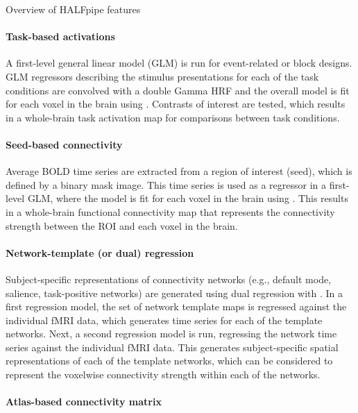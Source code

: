 \begin{featurebox}[label={box:features}]{Overview of HALFpipe features}

\paragraph{Task-based activations}

A first-level general linear model (GLM) is run for event-related or block
designs. GLM regressors describing the stimulus presentations for each of
the task conditions are convolved with a double Gamma HRF and the overall
model is fit for each voxel in the brain using 
\parencite{woolrich2001}. Contrasts of interest are tested, which
results in a whole-brain task activation map for comparisons between task
conditions.

\paragraph{Seed-based connectivity}

Average BOLD time series are extracted from a region of interest (seed),
which is defined by a binary mask image. This time series is used as a
regressor in a first-level GLM, where the model is fit for each voxel in
the brain using . This results in a whole-brain functional
connectivity map that represents the connectivity strength between the ROI
and each voxel in the brain.

\paragraph{Network-template (or dual) regression}

Subject-specific representations of connectivity networks (e.g., default
mode, salience, task-positive networks) are generated using dual regression
\parencite{beckmann2009} with . In a first
regression model, the set of network template maps is regressed against the
individual fMRI data, which generates time series for each of the template
networks. Next, a second regression model is run, regressing the network
time series against the individual fMRI data. This generates
subject-specific spatial representations of each of the template networks,
which can be considered to represent the voxelwise connectivity strength
within each of the networks.

\paragraph{Atlas-based connectivity matrix}


\end{featurebox}
